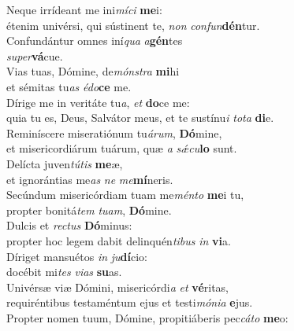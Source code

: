 \evenverse Neque irrídeant me ini\textit{mí}\textit{ci} \textbf{me}i:~\*\\
\evenverse étenim univérsi, qui sústinent te, \textit{non} \textit{con}\textit{fun}\textbf{dén}tur.\\
\oddverse Confundántur omnes iní\textit{qua} \textit{a}\textbf{gén}tes~\*\\
\oddverse \textit{su}\textit{per}\textbf{vá}cue.\\
\evenverse Vias tuas, Dómine, de\textit{món}\textit{stra} \textbf{mi}hi~\*\\
\evenverse et sémitas tu\textit{as} \textit{é}\textit{do}\textbf{ce} me.\\
\oddverse Dírige me in veritáte tu\textit{a}, \textit{et} \textbf{do}ce me:~\*\\
\oddverse quia tu es, Deus, Salvátor meus, et te sustínu\textit{i} \textit{to}\textit{ta} \textbf{di}e.\\
\evenverse Reminíscere miseratiónum tu\textit{á}\textit{rum}, \textbf{Dó}mine,~\*\\
\evenverse et misericordiárum tuárum, quæ \textit{a} \textit{sǽ}\textit{cu}\textbf{lo} sunt.\\
\oddverse Delícta juven\textit{tú}\textit{tis} \textbf{me}æ,~\*\\
\oddverse et ignorántias me\textit{as} \textit{ne} \textit{me}\textbf{mí}neris.\\
\evenverse Secúndum misericórdiam tuam me\textit{mén}\textit{to} \textbf{me}i tu,~\*\\
\evenverse propter bonitá\textit{tem} \textit{tu}\textit{am}, \textbf{Dó}mine.\\
\oddverse Dulcis et \textit{re}\textit{ctus} \textbf{Dó}minus:~\*\\
\oddverse propter hoc legem dabit delinquén\textit{ti}\textit{bus} \textit{in} \textbf{vi}a.\\
\evenverse Díriget mansuétos \textit{in} \textit{ju}\textbf{dí}cio:~\*\\
\evenverse docébit mi\textit{tes} \textit{vi}\textit{as} \textbf{su}as.\\
\oddverse Univérsæ viæ Dómini, misericórdi\textit{a} \textit{et} \textbf{vé}ritas,~\*\\
\oddverse requiréntibus testaméntum ejus et testi\textit{mó}\textit{ni}\textit{a} \textbf{e}jus.\\
\evenverse Propter nomen tuum, Dómine, propitiáberis pec\textit{cá}\textit{to} \textbf{me}o:~\*\\
